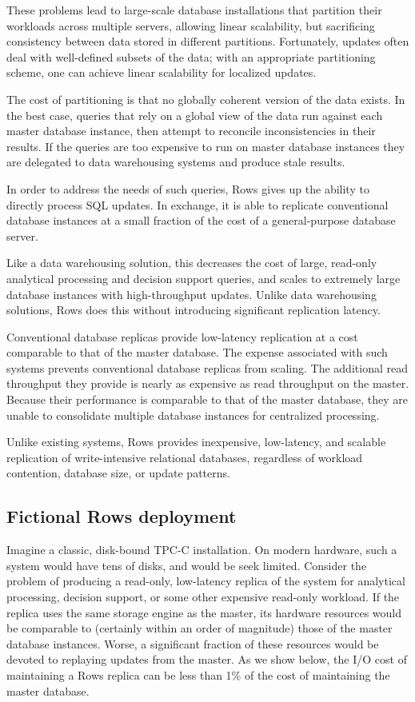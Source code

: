 \documentclass{sig-alternate-sigmod08}
\newcommand{\rows}{Rows\xspace}
\begin{document}
These problems lead to large-scale database installations that partition
their workloads across multiple servers, allowing linear scalability,
but sacrificing consistency between data stored in different
partitions.  Fortunately, updates often deal with well-defined subsets
of the data; with an appropriate partitioning scheme, one can achieve
linear scalability for localized updates.

The cost of partitioning is that no globally coherent version of the
data exists.  In the best case, queries that rely on a global view of
the data run against each master database instance, then attempt to
reconcile inconsistencies in their results.  If the queries are
too expensive to run on master database instances they are delegated
to data warehousing systems and produce stale results.

In order to address the needs of such queries, \rows gives up the ability to
directly process SQL updates.  In exchange, it is able to replicate
conventional database instances at a small fraction of the cost of a
general-purpose database server.

Like a data warehousing solution, this decreases the cost of large,
read-only analytical processing and decision support queries, and scales to extremely
large database instances with high-throughput updates.  Unlike data
warehousing solutions, \rows does this without introducing significant
replication latency.

Conventional database replicas provide low-latency replication at a
cost comparable to that of the master database.  The expense associated with such systems
prevents conventional database replicas from scaling.  The additional
read throughput they provide is nearly as expensive as read throughput
on the master.  Because their performance is comparable to that of the
master database, they are unable to consolidate multiple database
instances for centralized processing.

Unlike existing systems, \rows provides inexpensive, low-latency, and
scalable replication of write-intensive relational databases,
regardless of workload contention, database size, or update patterns.

\subsection{Fictional \rows deployment}

Imagine a classic, disk-bound TPC-C installation.  On modern hardware,
such a system would have tens of disks, and would be seek limited.
Consider the problem of producing a read-only, low-latency replica of
the system for analytical processing, decision support, or some other
expensive read-only workload.  If the replica uses the same storage
engine as the master, its hardware resources would be comparable to
(certainly within an order of magnitude) those of the master database
instances.  Worse, a significant fraction of these resources would be
devoted to replaying updates from the master.  As we show below,
the I/O cost of maintaining a \rows replica can be less than 1\% of
the cost of maintaining the master database.
\end{document}
